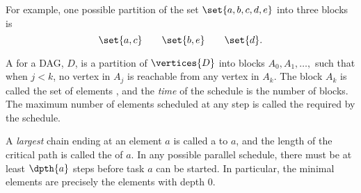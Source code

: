 For example, one possible partition of the set $\set{a, b, c, d, e}$
into three blocks is
\[
\set{a, c} \qquad \set{b, e} \qquad \set{d}.
\]

\begin{definition}\label{def:schedule}
A  for a DAG, $D$, is a partition of
$\vertices{D}$ into blocks $A_0, A_1,\dots,$ such that when $j < k$,
no vertex in $A_j$ is reachable from any vertex in $A_k$.  The block
$A_k$ is called the set of elements , and
the \emph{time} of the schedule is the number of blocks.  The
maximum number of elements scheduled at any step is called the
 required by the schedule.
\end{definition}

\iffalse

So the schedule we chose above for clothes has four steps
\begin{align*}
A_0 = & \set{\text{leftsock, rightsock, underwear, shirt}},\\
A_1 = & \set{\text{pants, sweater}},\\
A_2 = & \set{\text{leftshoe, rightshoe, belt}},\\
A_3 = & \set{\text{jacket}}.
\end{align*}
and requires four processors (to complete the first step).

Notice that the dependencies constrain the tasks underwear, pants,
belt, and jacket to be done in sequence.  This implies
that at least four steps are needed in \emph{every} schedule for
getting dressed, since if we used fewer than four steps, two of these
tasks would have to be scheduled at the same time.  A set of tasks
that must be done in sequence like this is called a \emph{chain}.

\begin{definition}
A \term{chain} a set of vertices in a DAG such that any two different
vertices in the set are comparable, meaning there is a walk from one
to the other\footnote{We'll define this term with slightly more
  technical vocabulary in Def.~\ref{def:path_total}, but the concept
  is fairly intuitive}.  A chain is said to \index{end of
    chain}\emph{end at} its maximum element.
\end{definition}
\fi

A \emph{largest} chain ending at an element $a$ is called a
 to $a$, and the length of the critical path is
called the  of $a$.  In any possible parallel schedule,
there must be at least $\dpth{a}$ steps before task $a$ can be
started.  In particular, the minimal elements are precisely the
elements with depth 0.

